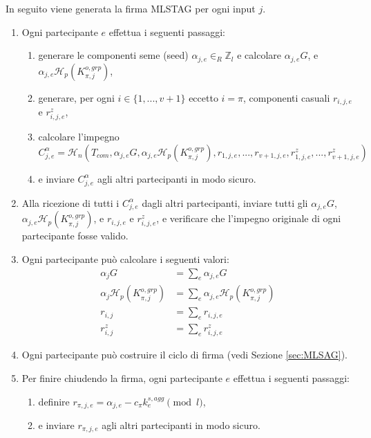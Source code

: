 In seguito viene generata la firma MLSTAG per ogni input $j$.
\begin{enumerate}
    \item Ogni partecipante $e$ effettua i seguenti passaggi:
    \begin{enumerate}
        \item generare le componenti seme (seed) $\alpha_{j,e} \in_R \mathbb{Z}_l$ e calcolare $\alpha_{j,e} G$, e $\alpha_{j,e} \mathcal{H}_p(K^{o,grp}_{\pi,j})$,
        \item generare, per ogni $i \in \{1,...,v+1\}$ eccetto $i = \pi$, componenti casuali $r_{i,j,e}$ e $r^z_{i,j,e}$,
        \item calcolare l'impegno
        \[C^{\alpha}_{j,e} = \mathcal{H}_n(T_{com},\alpha_{j,e} G, \alpha_{j,e} \mathcal{H}_p(K^{o,grp}_{\pi,j}),r_{1,j,e},...,r_{v+1,j,e},r^z_{1,j,e},...,r^z_{v+1,j,e})\]
        \item e inviare $C^{\alpha}_{j,e}$ agli altri partecipanti in modo sicuro.
    \end{enumerate}
    \item Alla ricezione di tutti i $C^{\alpha}_{j,e}$ dagli altri partecipanti, inviare tutti gli $\alpha_{j,e} G$, $\alpha_{j,e} \mathcal{H}_p(K^{o,grp}_{\pi,j})$, e $r_{i,j,e}$ e $r^z_{i,j,e}$, e verificare che l'impegno originale di ogni partecipante fosse valido.
    \item Ogni partecipante può calcolare i seguenti valori:
    \begin{align*}
        \alpha_{j} G &= \sum_e \alpha_{j,e} G\\
        \alpha_{j} \mathcal{H}_p(K^{o,grp}_{\pi,j}) &= \sum_e \alpha_{j,e} \mathcal{H}_p(K^{o,grp}_{\pi,j})\\
        r_{i,j} &= \sum_e r_{i,j,e}\\
        r^{z}_{i,j} &= \sum_e r^z_{i,j,e}
    \end{align*}{}
    \item Ogni partecipante può costruire il ciclo di firma (vedi Sezione \ref{sec:MLSAG}).
    \item Per finire chiudendo la firma, ogni partecipante $e$ effettua i seguenti passaggi:
    \begin{enumerate}
        \item definire $r_{\pi,j,e} = \alpha_{j,e} - c_{\pi} k^{s,agg}_e \pmod l$,
        \item e inviare $r_{\pi,j,e}$ agli altri partecipanti in modo sicuro.

\end{enumerate}
\end{enumerate}
